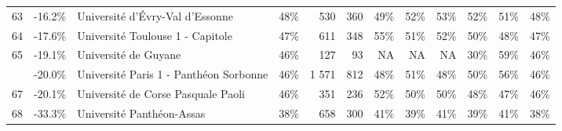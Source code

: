 \documentclass[12pt,french,landscape]{article}
\begin{document}
\begin{longtable}{rrlrrrrrrlrr}
\rowcolor{gray!6}  63 & -16.2\% & Université d'Évry-Val d'Essonne & 48\% & 530 & 360 & 49\% & 52\% & 53\% & 52\% & 51\% & 48\%\\
64 & -17.6\% & Université Toulouse 1 - Capitole & 47\% & 611 & 348 & 55\% & 51\% & 52\% & 50\% & 48\% & 47\%\\
\rowcolor{gray!6}  65 & -19.1\% & Université de Guyane & 46\% & 127 & 93 & NA & NA & NA & 30\% & 59\% & 46\%\\
\addlinespace
66 & -20.0\% & Université Paris 1 - Panthéon Sorbonne & 46\% & 1 571 & 812 & 48\% & 51\% & 48\% & 50\% & 56\% & 46\%\\
\rowcolor{gray!6}  67 & -20.1\% & Université de Corse Pasquale Paoli & 46\% & 351 & 236 & 52\% & 50\% & 50\% & 48\% & 47\% & 46\%\\
68 & -33.3\% & Université Panthéon-Assas & 38\% & 658 & 300 & 41\% & 39\% & 41\% & 39\% & 41\% & 38\%\\*
\end{longtable}
\end{document}
